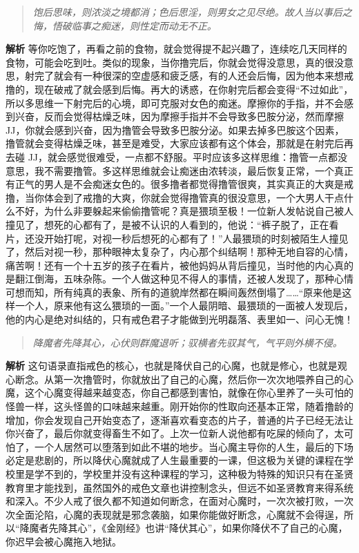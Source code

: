 \begin{quote}\it
    饱后思味，则浓淡之境都消；色后思淫，则男女之见尽绝。故人当以事后之悔，悟破临事之痴迷，则性定而动无不正。
\end{quote}

\textbf{解析} 等你吃饱了，再看之前的食物，就会觉得提不起兴趣了，连续吃几天同样的食物，可能会吃到吐。类似的现象，当你撸完后，你就会觉得没意思，真的很没意思，射完了就会有一种很深的空虚感和疲乏感，有的人还会后悔，因为他本来想戒撸的，现在破戒了就会感到后悔。再大的诱惑，在你射完后都会变得“不过如此”，所以多思维一下射完后的心境，即可克服对女色的痴迷。摩擦你的手指，并不会感到兴奋，反而会觉得枯燥乏味，因为摩擦手指并不会导致多巴胺分泌，然而摩擦 JJ，你就会感到兴奋，因为撸管会导致多巴胺分泌。如果去掉多巴胺这个因素，撸管就会变得枯燥乏味，甚至是难受，大家应该都有这个体会，那就是在射完后再去碰 JJ，就会感觉很难受，一点都不舒服。平时应该多这样思维：撸管一点都没意思，我不需要撸管。多这样思维就会让痴迷由浓转淡，最后恢复正常，一个真正有正气的男人是不会痴迷女色的。很多撸者都觉得撸管很爽，其实真正的大爽是戒撸，当你体会到了戒撸的大爽，你就会觉得撸管真的很没意思，一个大男人干点什么不好，为什么非要躲起来偷偷撸管呢？真是猥琐至极！一位新人发帖说自己被人撞见了，想死的心都有了，是被不认识的人看到的，他说：“裤子脱了，正在看片，还没开始打呢，对视一秒后想死的心都有了！”人最猥琐的时刻被陌生人撞见了，然后对视一秒，那种眼神太复杂了，内心那个纠结啊！那种无地自容的心情，痛苦啊！还有一个十五岁的孩子在看片，被他妈妈从背后撞见，当时他的内心真的是翻江倒海，五味杂陈。一个人做这种见不得人的事情，还被人发现了，那种心情可想而知，所有纯真的表象、所有的道貌岸然都在瞬间轰然倒塌了……“原来他是这样一个人，原来他有这么猥琐的一面。”一个人最阴暗、最猥琐的一面被人发现后，他的内心是绝对纠结的，只有戒色君子才能做到光明磊落、表里如一、问心无愧！

\begin{quote}\it
    降魔者先降其心，心伏则群魔退听；驭横者先驭其气，气平则外横不侵。
\end{quote}

\textbf{解析} 这句语录直指戒色的核心，也就是降伏自己的心魔，也就是修心，也就是观心断念。从第一次撸管时，你就放出了自己的心魔，然后你一次次地喂养自己的心魔，这个心魔变得越来越变态，你自己都感到害怕，就像在你心里养了一头可怕的怪兽一样，这头怪兽的口味越来越重。刚开始你的性取向还基本正常，随着撸龄的增加，你会发现自己开始变态了，逐渐喜欢看变态的片子，普通的片子已经无法让你兴奋了，最后你就变得畜生不如了。上次一位新人说他都有吃屎的倾向了，太可怕了，一个人居然可以堕落到如此不堪的地步。当心魔主导你的人生，最后的下场必定是悲剧的，所以降伏心魔就成了人生最重要的一课，但这极为关键的课程在学校里是学不到的，学校里并没有这种课程的学习，这种极为特殊的知识只有在圣贤教育里才能找到，虽然国外的戒色文章也讲控制念头，但远不如圣贤教育来得系统和深入。不少人戒了很久都不知道如何断念，在面对心魔时，一次次被打败，一次次全面沦陷，心魔的表现就是邪念袭脑，如果你能做好断念，心魔就不会得逞，所以“降魔者先降其心”，《金刚经》也讲“降伏其心”，如果你降伏不了自己的心魔，你迟早会被心魔拖入地狱。


